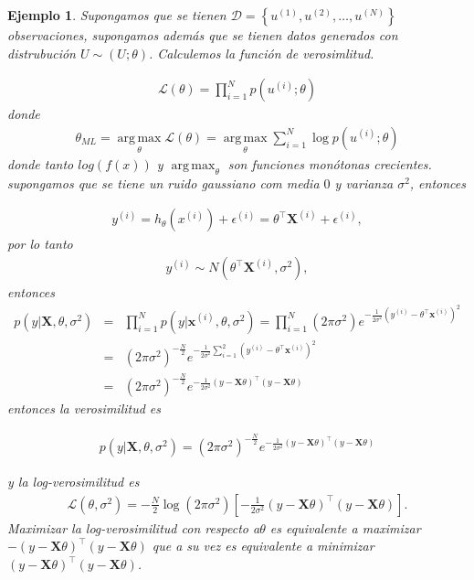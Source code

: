 \documentclass[12pt]{article}
\newtheorem{Ejem}{Ejemplo}%
\begin{document}
\begin{Ejem}
Supongamos que se tienen $\mathcal{D}=\left\{u^{(1)},u^{(2)},\ldots,u^{(N)}\right\}$ observaciones, supongamos adem\'as que se tienen datos generados con distrubuci\'on $U\sim\left(U;\theta\right)$. Calculemos la funci\'on de verosimlitud.

\begin{eqnarray}
\mathcal{L}\left(\theta\right)=\prod_{i=1}^{N}p\left(u^{(i)};\theta\right)
\end{eqnarray}
donde
\begin{eqnarray}
\theta_{ML}=\operatorname*{arg\,max}_{\theta}\mathcal{L}\left(\theta\right)=\operatorname*{arg\,max}_{\theta}\sum_{i=1}^{N}\log p\left(u^{(i)};\theta\right)
\end{eqnarray}
donde tanto $log(f(x))$ y $\operatorname*{arg\,max}_{\theta}$ son funciones mon\'otonas crecientes. supongamos que se tiene un ruido gaussiano com media $0$ y varianza $\sigma^{2}$, entonces

\begin{eqnarray}
y^{(i)}=h_{\theta}\left(x^{(i)}\right)+\epsilon^{(i)}=\theta^{\top}\mathbf{X}^{(i)}+\epsilon^{(i)},
\end{eqnarray}
por lo tanto
\begin{eqnarray}
y^{(i)}\sim N\left(\theta^{\top}\mathbf{X}^{(i)},\sigma^{2}\right), 
\end{eqnarray}
entonces
\begin{eqnarray}
p\left(y|\mathbf{X},\theta,\sigma^{2}\right)&=&\prod_{i=1}^{N}p\left(y|\mathbf{x}^{(i)},\theta,\sigma^{2}\right)=\prod_{i=1}^{N}\left(2\pi\sigma^{2}\right)e^{-\frac{1}{2\sigma^{2}}\left(y^{(i)}-\theta^{\top}\mathbf{x}^{(i)}\right)^{2}}\\
&=&\left(2\pi\sigma^{2}\right)^{-\frac{N}{2}}e^{-\frac{1}{2\sigma^{2}}\sum_{i=1}^{2}\left(y^{(i)}-\theta^{\top}\mathbf{x}^{(i)}\right)^{2}}\\
&=&\left(2\pi\sigma^{2}\right)^{-\frac{N}{2}}e^{-\frac{1}{2\sigma^{2}}\left(y-\mathbf{X}\theta\right)^{\top}\left(y-\mathbf{X}\theta\right)}
\end{eqnarray}
entonces la verosimilitud es

\begin{eqnarray}
p\left(y|\mathbf{X},\theta,\sigma^{2}\right)=\left(2\pi\sigma^{2}\right)^{-\frac{N}{2}}e^{-\frac{1}{2\sigma^{2}}\left(y-\mathbf{X}\theta\right)^{\top}\left(y-\mathbf{X}\theta\right)}
\end{eqnarray}

y la log-verosimilitud es
\begin{eqnarray}
\mathcal{L}\left(\theta,\sigma^{2}\right)=-\frac{N}{2}\log\left(2\pi\sigma^{2}\right)\left[-\frac{1}{2\sigma^{2}}\left(y-\mathbf{X}\theta\right)^{\top}\left(y-\mathbf{X}\theta\right)\right].
\end{eqnarray}
Maximizar la log-verosimilitud con respecto a$\theta$ es equivalente a maximizar $-\left(y-\mathbf{X}\theta\right)^{\top}\left(y-\mathbf{X}\theta\right)$ que a su vez es equivalente a minimizar $\left(y-\mathbf{X}\theta\right)^{\top}\left(y-\mathbf{X}\theta\right)$.

\end{Ejem}
\end{document}
